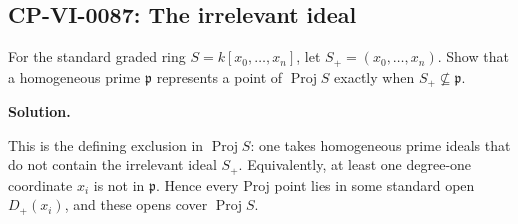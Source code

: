 
\subsection*{CP-VI-0087: The irrelevant ideal}

For the standard graded ring $S=k[x_0,\dots,x_n]$, let $S_+=(x_0,\dots,x_n)$. Show that a homogeneous prime $\mathfrak p$ represents a point of $\operatorname{Proj}S$ exactly when $S_+\not\subseteq\mathfrak p$.

\medskip
\noindent\textbf{Solution.}

This is the defining exclusion in $\operatorname{Proj}S$: one takes homogeneous prime ideals that do not contain the irrelevant ideal $S_+$. Equivalently, at least one degree-one coordinate $x_i$ is not in $\mathfrak p$. Hence every Proj point lies in some standard open $D_+(x_i)$, and these opens cover $\operatorname{Proj}S$.

